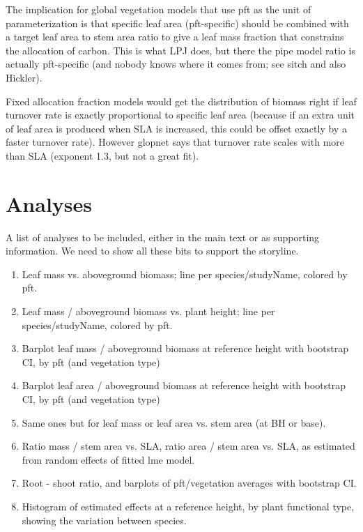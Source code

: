 \documentclass[a4paper]{article}
\begin{document}
The implication for global vegetation models that use pft as the unit of parameterization is that specific leaf area (pft-specific) should be combined with a target leaf area to stem area ratio to give a leaf mass fraction that constrains the allocation of carbon. This is what LPJ does, but there the pipe model ratio is actually pft-specific (and nobody knows where it comes from; see sitch and also Hickler).

Fixed allocation fraction models would get the distribution of biomass right if leaf turnover rate is exactly proportional to specific leaf area (because if an extra unit of leaf area is produced when SLA is increased, this could be offset exactly by a faster turnover rate). However glopnet says that turnover rate scales with more than SLA (exponent 1.3, but not a great fit). 



\section{Analyses}

A list of analyses to be included, either in the main text or as supporting information. We need to show all these bits to support the storyline.

\begin{enumerate}
  \item Leaf mass vs. aboveground biomass; line per species/studyName, colored by pft.
  \item Leaf mass / aboveground biomass vs. plant height; line per species/studyName, colored by pft.
  \item Barplot leaf mass / aboveground biomass at reference height with bootstrap CI, by pft (and vegetation type)
  \item Barplot leaf area / aboveground biomass at reference height with bootstrap CI, by pft (and vegetation type)
  \item Same ones but for leaf mass or leaf area vs. stem area (at BH or base).
  \item Ratio mass / stem area vs. SLA, ratio area / stem area vs. SLA, as estimated from random effects of fitted lme model.
  \item Root - shoot ratio, and barplots of pft/vegetation averages with bootstrap CI.
  \item Histogram of estimated effects at a reference height, by plant functional type, showing the variation between species. 
\end{enumerate}
\end{document}
